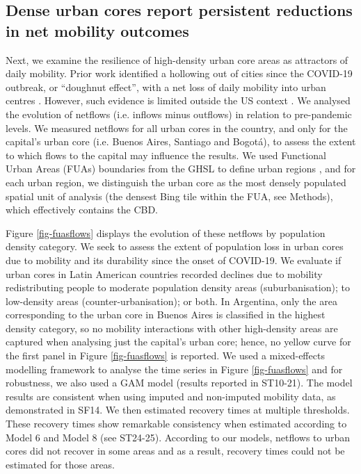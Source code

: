 \documentclass[fleqn,10pt]{wlscirep}
\begin{document}
\subsection*{Dense urban cores report persistent reductions in net mobility outcomes}

Next, we examine the resilience of high-density urban core areas as attractors of daily mobility. Prior work identified a hollowing out of cities since the COVID-19 outbreak, or ``doughnut effect'', with a net loss of daily mobility into urban centres \cite{ramani2024working}. However, such evidence is limited outside the US context \cite{ramani2024working, gonzalez2023donut}. We analysed the evolution of netflows (i.e. inflows minus outflows) in relation to pre-pandemic levels. We measured netflows for all urban cores in the country, and only for the capital's urban core (i.e. Buenos Aires, Santiago and Bogotá), to assess the extent to which flows to the capital may influence the results. We used Functional Urban Areas (FUAs) boundaries from the GHSL to define urban regions \cite{ceu.jrc.2019}, and for each urban region, we distinguish the urban core as the most densely populated spatial unit of analysis (the densest Bing tile within the FUA, see Methods), which effectively contains the CBD. 

Figure \ref{fig-fuasflows} displays the evolution of these netflows by population density category. We seek to assess the extent of population loss in urban cores due to mobility and its durability since the onset of COVID-19. We evaluate if urban cores in Latin American countries recorded declines due to mobility redistributing people to moderate population density areas (suburbanisation); to low-density areas (counter-urbanisation); or both. In Argentina, only the area corresponding to the urban core in Buenos Aires is classified in the highest density category, so no mobility interactions with other high-density areas are captured when analysing just the capital's urban core; hence, no yellow curve for the first panel in Figure \ref{fig-fuasflows} is reported. We used a mixed-effects modelling framework to analyse the time series in Figure \ref{fig-fuasflows} and for robustness, we also used a GAM model (results reported in ST10-21). The model results are consistent when using imputed and non-imputed mobility data, as demonstrated in SF14. We then estimated recovery times at multiple thresholds. These recovery times show remarkable consistency when estimated according to Model 6 and Model 8 (see ST24-25). According to our models, netflows to urban cores did not recover in some areas and as a result, recovery times could not be estimated for those areas.
\end{document}
